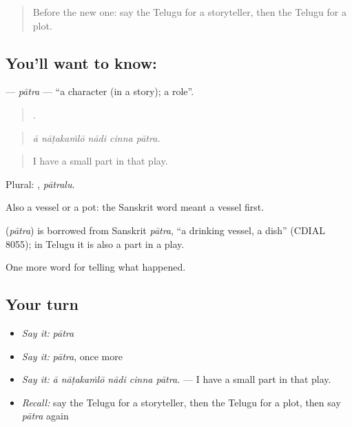 \label{lesson:TE-C372-patra}



\begin{quote}
Before the new one: say the Telugu for a storyteller, then the Telugu for a plot.
\end{quote}

\subsection*{You'll want to know: }
\textbf{} — \emph{pātra} — \textquotedblleft{}a character (in a story); a role\textquotedblright{}.

\begin{quote}
    .
\end{quote}

\begin{quote}
\emph{ā nāṭakaṁlō nādi cinna pātra.}
\end{quote}

\begin{quote}
I have a small part in that play.
\end{quote}

Plural: , \emph{pātralu}.

Also a vessel or a pot: the Sanskrit word meant a vessel first.

\begin{cousinweb}
\textbf{} (\emph{pātra}) is borrowed from Sanskrit \emph{pātra}, \textquotedblleft{}a drinking vessel, a dish\textquotedblright{} (CDIAL 8055); in Telugu it is also a part in a play.
\end{cousinweb}

\begin{grammarlens}[title={What you've built}]
One more word for telling what happened.
\end{grammarlens}

\subsection*{Your turn}
\begin{itemize}
\raggedright
  \item \emph{Say it:} \emph{pātra}
  \item \emph{Say it:} \emph{pātra}, once more
  \item \emph{Say it:} \emph{ā nāṭakaṁlō nādi cinna pātra.} — I have a small part in that play.
  \item \emph{Recall:} say the Telugu for a storyteller, then the Telugu for a plot, then say \emph{pātra} again
\end{itemize}

